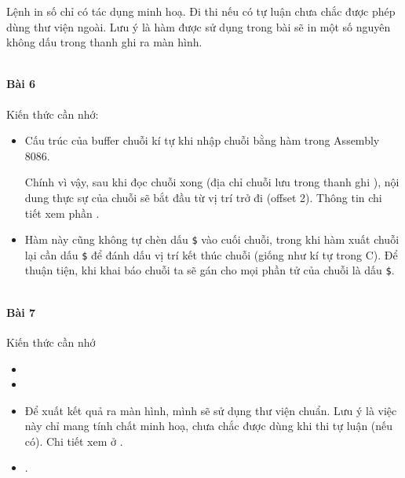 \documentclass[main.tex]{subfiles}
\begin{document}
Lệnh in số chỉ có tác dụng minh hoạ. Đi thi nếu có tự luận chưa chắc được phép dùng thư viện ngoài. Lưu ý là hàm  được sử dụng trong bài sẽ in một số nguyên không dấu trong thanh ghi  ra màn hình.

\inputminted[linenos,breaklines]{nasm}{answer_source/Bai5.asm}
\paragraph*{Bài 6}
Kiến thức cần nhớ:
\begin{itemize}
    \item Cấu trúc của buffer chuỗi kí tự khi nhập chuỗi bằng hàm  trong Assembly 8086.
    \begin{figure}[H]
        \centering
    \end{figure}
        Chính vì vậy, sau khi đọc chuỗi xong (địa chỉ chuỗi lưu trong thanh ghi ), nội dung thực sự của chuỗi sẽ bắt đầu từ vị trí \cd{[dx + 2]} trở đi (offset 2). Thông tin chi tiết xem phần .
    \item Hàm này cũng không tự chèn dấu \verb#$# vào cuối chuỗi, trong khi hàm xuất chuỗi lại cần dấu \verb#$# để đánh dấu vị trí kết thúc chuỗi (giống như kí tự  trong C). Để thuận tiện, khi khai báo chuỗi ta sẽ gán cho mọi phần tử của chuỗi là dấu \verb#$#.
\end{itemize}

\inputminted[linenos,breaklines]{nasm}{answer_source/Bai6.asm}

\paragraph*{Bài 7}
Kiến thức cần nhớ 
\begin{itemize}
    \item {}
    \item {}
    \item Để xuất kết quả ra màn hình, mình sẽ sử dụng thư viện chuẩn. Lưu ý là việc này chỉ mang tính chất minh hoạ, chưa chắc được dùng khi thi tự luận (nếu có). Chi tiết xem ở .
    \item {}.
\end{itemize}
\inputminted[linenos,breaklines]{nasm}{answer_source/Bai7.asm}
\end{document}
